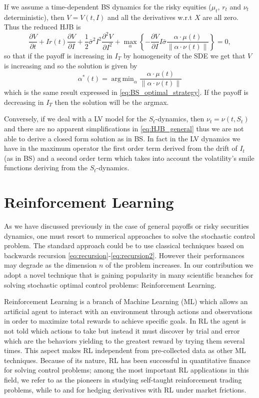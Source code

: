 \documentclass[11pt]{article}
\DeclareMathOperator*{\argmin}{arg\,min}
\begin{document}
If we assume a time-dependent BS dynamics for the risky equities ($\mu_t$, $r_t$ and $\nu_t$ deterministic), then $V = V(t,I)$ and all the derivatives w.r.t $X$ are all zero. Thus the reduced HJB is
\begin{equation}
	\frac{\partial V}{\partial t} +  I r(t)\frac{\partial V}{\partial I}  + \frac{1}{2}\bar{\sigma}^2I^2\frac{\partial^2V}{\partial I^2} + \max_\alpha \left\{ -\frac{\partial V}{\partial I} I  \bar{\sigma}\frac{\alpha \cdot \mu(t)}{\|\alpha \cdot \nu(t)\|}\right\} = 0,
\end{equation}
so that if the payoff is increasing in $I_T$ by homogeneity of the SDE we get that $V$ is increasing and so the solution is given by
\begin{equation}
 \alpha^*(t) = \argmin_\alpha \frac{\alpha \cdot \mu(t)}{\|\alpha \cdot \nu(t)\|}
	\end{equation}
which is the same result expressed in \cref{eq:BS_optimal_strategy}. If the payoff is decreasing in $I_T$ then the solution will be the argmax.

Conversely, if we deal with a LV model for the $S_t$-dynamics, then $\nu_t = \nu(t,S_t)$ and there are no apparent simplifications in \cref{eq:HJB_general} thus we are not able to derive a closed form solution as in BS. In fact in the LV dynamics we have in the maximum operator the first order term derived from the drift of $I_t$ (as in BS) and a second order term which takes into account the volatility's smile functions deriving from the $S_t$-dynamics. 


\section{Reinforcement Learning}\label{sec:RL}
As we have discussed previously in the case of general payoffs or risky securities dynamics, one must resort to numerical approaches to solve the stochastic control problem. The standard approach could be to use classical techniques based on backwards recursion \eqref{eq:recursion}-\eqref{eq:recursion2}. However their performances may degrade as the dimension $n$ of the problem increases. In our contribution we adopt a novel technique that is gaining popularity in many scientific branches for solving stochastic optimal control problems: Reinforcement Learning. 

Reinforcement Learning is a branch of Machine Learning (ML) which allows an artificial agent to interact with an environment through actions and observations in order to maximize total rewards to achieve specific goals. In RL the agent is not told which actions to take but instead it must discover by trial and error which are the behaviors yielding to the greatest reward by trying them several times. This aspect makes RL independent  from pre-collected data as other ML techniques. Because of its nature, RL has been successful in quantitative finance for solving control problems; among the most important RL applications in this field, we refer to \textcite{pioneerrlfinance} as the pioneers in studying self-taught reinforcement trading problems, while to \textcite{rlintroductionfinance} and \textcite{rlfinance} for hedging derivatives with RL under market frictions.
\end{document}
